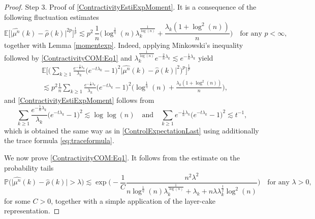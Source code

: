 \documentclass[11pt,a4paper,oneside]{amsart}
\numberwithin{equation}{section}
\begin{document}
\begin{proof}
{\sc Step 3. Proof of \eqref{ContractivityEstiExpMoment}. }It is a consequence of the following fluctuation estimates
%
\begin{equation}\label{ContractivityCOM:Eq1}
%
\mathbb{E}\big[\vert\widehat{\mu^n}(k)-\widehat{\rho}(k)\vert^{2p}\big]^{\frac{1}{p}}\lesssim p^2\,\frac{1}{n}\bigg(\log^{\frac{1}{\eta}}(n)\lambda^{\frac{1}{\log(n)}}_k+\frac{\lambda_k(1+\log^2(n))}{n}\bigg)\quad\text{for any $p<\infty$},
%
\end{equation}
%
together with Lemma \ref{momentexp}. Indeed, applying Minkowski's inequality followed by \eqref{ContractivityCOM:Eq1} and $\lambda^{\frac{1}{\log(n)}}_k e^{-\frac{2}{n}\lambda_k}\lesssim e^{-\frac{1}{n}\lambda_k}$ yield
%
\begin{align*}
%
&\mathbb{E}\bigg[\Big(\sum_{k\geq 1}\frac{e^{-\frac{2}{n}\lambda_k}}{\lambda_k}\big(e^{-t\lambda_k}-1\big)^2\vert\widehat{\mu^n}(k)-\widehat{\rho}(k)\vert^2\Big)^p\bigg]^{\frac{1}{p}}\\
&\lesssim p^2\frac{1}{n}\sum_{k\geq 1}\frac{e^{-\frac{1}{n}\lambda_k}}{\lambda_k}\big(e^{-t\lambda_k}-1\big)^2\bigg(\log^{\frac{1}{\eta}}(n)+\frac{\lambda_k(1+\log^2(n))}{n}\bigg),
%
\end{align*}
%
and \eqref{ContractivityEstiExpMoment} follows from
%
\begin{equation}\label{ContractivityConclusion:Eq2}
%
\sum_{k\geq 1}\frac{e^{-\frac{1}{n}\lambda_k}}{\lambda_k}\big(e^{-t\lambda_k}-1\big)^2\lesssim \log\log(n)\quad\text{and}\quad\sum_{k\geq 1}e^{-\frac{1}{n}\lambda_k}\big(e^{-t\lambda_k}-1\big)^2\lesssim t^{-1},
%
\end{equation}
%
which is obtained the same way as in \eqref{ControlExpectationLast} using additionally the trace formula \eqref{eq:traceformula}.


%
\medskip
%

We now prove \eqref{ContractivityCOM:Eq1}. It follows from the estimate on the probability tails
%
\begin{equation}\label{ContractivityCOM:Eq2}
%
\mathbb{P}\big(\vert\widehat{\mu^n}(k)-\widehat{\rho}(k)\vert>\lambda\big)\lesssim \exp\bigg(-\frac{1}{C}\frac{n^2\lambda^2}{n\log^{\frac{1}{\eta}}(n)\lambda^{\frac{1}{\log(n)}}_k+\lambda_k+n\lambda\lambda^{\frac{1}{2}}_k\log^2(n)}\bigg)\quad\text{for any $\lambda>0$},
%
\end{equation}
%
for some $C>0$, together with a simple application of the layer-cake representation. 

%
\medskip
%


\end{proof}
\end{document}
